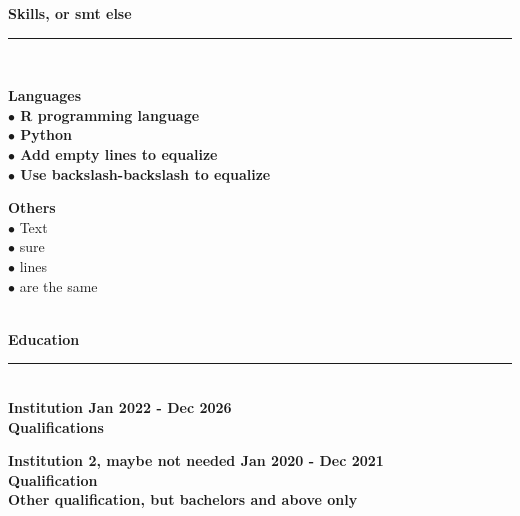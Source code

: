 \documentclass[a4 paper, 14pt]{article}
\begin{document}
\noindent \LARGE \bf{Skills, or smt else} \vspace{-0.2cm}\\
\rule{18cm}{2pt} \\ %
\normalsize \normalfont
\noindent \begin{minipage}{0.5\textwidth}
	\vspace{0.1cm}
\bf{Languages} \\
\normalfont
$\bullet$ R programming language\\
$\bullet$ Python \\
$\bullet$ Add empty lines to equalize \\
$\bullet$ Use backslash-backslash to equalize \\
	\end{minipage}
	\hfill
\hspace{2cm}
\begin{minipage}{0.5\textwidth}
	\vspace{0.1cm}
	\textbf{Others} \\
	$\bullet$ Text \\
	$\bullet$ sure\\
	$\bullet$ lines\\
	$\bullet$ are the same \\
\end{minipage}
\\

\noindent \LARGE \bf{Education} \vspace{-0.2cm}\\
\rule{18cm}{2pt} \\ %
\large \bf{Institution} \hfill Jan 2022 - Dec 2026 \\
\normalsize \normalfont Qualifications \\
\vspace{-0.3cm}

\noindent
\large \bf{Institution 2, maybe not needed} \hfill Jan 2020 - Dec 2021  \\
\normalsize \normalfont Qualification \\
Other qualification, but bachelors and above only
\end{document}
